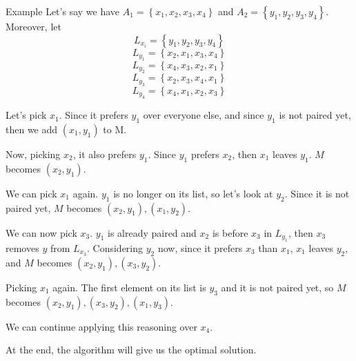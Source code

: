\documentclass[a4paper]{article}
\begin{document}
\begin{parag}{Example}
    Let's say we have $A_1 = \left\{x_1, x_2, x_3, x_4\right\}$ and $A_2 = \left\{y_1, y_2, y_3, y_4\right\}$. Moreover, let
    \[L_{x_i} = \left\{y_1, y_2, y_3, y_4\right\}\]
   \[L_{y_1} = \left\{x_2, x_1, x_3, x_4\right\}\]
   \[L_{y_2} = \left\{x_4, x_3, x_2, x_1\right\}\]
   \[L_{y_3} = \left\{x_2, x_3, x_4, x_1\right\}\]
   \[L_{y_4} = \left\{x_4, x_1, x_2, x_3\right\}\]

   Let's pick $x_1$. Since it prefers $y_1$ over everyone else, and since $y_1$ is not paired yet, then we add $\left(x_1, y_1\right)$ to M.

   Now, picking $x_2$, it also prefers $y_1$. Since $y_1$ prefers $x_2$, then $x_1$ leaves $y_1$. $M$ becomes $\left(x_2, y_1\right)$.

   We can pick $x_1$ again. $y_1$ is no longer on its list, so let's look at $y_2$. Since it is not paired yet, $M$ becomes $\left(x_2, y_1\right), \left(x_1, y_2\right)$.

   We can now pick $x_3$. $y_1$ is already paired and $x_2$ is before $x_3$ in $L_{y_1}$, then $x_3$ removes $y$ from $L_{x_3}$. Considering $y_2$ now, since it prefers $x_3$ than $x_1$, $x_1$ leaves $y_2$, and $M$ becomes $\left(x_2, y_1\right), \left(x_3, y_2\right)$.

   Picking $x_1$ again. The first element on its list is $y_3$ and it is not paired yet, so $M$ becomes $\left(x_2, y_1\right),\left(x_3,y_2\right),\left(x_1,y_3\right)$.

   We can continue applying this reasoning over $x_4$.

   At the end, the algorithm will give us the optimal solution.
\end{parag}
\end{document}
